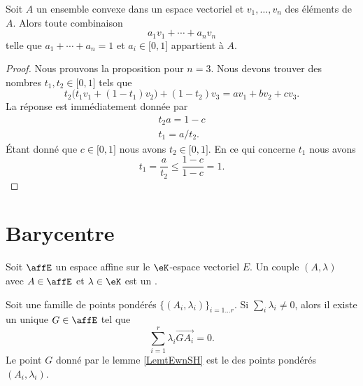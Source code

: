 \begin{proposition}     \label{PropPoNpPz}
    Soit \( A\) un ensemble convexe dans un espace vectoriel et \( v_1,\ldots, v_n\) des éléments de \( A\). Alors toute combinaison
    \begin{equation}
        a_1v_1+\cdots +a_nv_n
    \end{equation}
    telle que \( a_1+\cdots +a_n=1\) et \( a_i\in\mathopen[ 0 , 1 \mathclose]\) appartient à \( A\).
\end{proposition}

\begin{proof}
    Nous prouvons la proposition pour \( n=3\). Nous devons trouver des nombres \( t_1,t_2\in \mathopen[ 0 , 1 \mathclose]\) tels que
    \begin{equation}
        t_2\big( t_1v_1+(1-t_1)v_2 \big)+(1-t_2)v_3=av_1+bv_2+cv_3.
    \end{equation}
    La réponse est immédiatement donnée par
    \begin{subequations}
        \begin{align}
            t_2a=1-c\\
            t_1=a/t_2.
        \end{align}
    \end{subequations}
    Étant donné que \( c\in \mathopen[ 0 , 1 \mathclose]\) nous avons \( t_2\in\mathopen[ 0 , 1 \mathclose]\). En ce qui concerne \( t_1\) nous avons
    \begin{equation}
        t_1=\frac{ a }{ t_2 }\leq \frac{ 1-c }{ 1-c }=1.
    \end{equation}
\end{proof}

\section{Barycentre}

Soit \( \affE\) un espace affine sur le \( \eK\)-espace vectoriel \( E\). Un couple \( (A,\lambda)\) avec \( A\in \affE\) et \( \lambda\in \eK\) est un .

\begin{lemmaDef}        \label{LemtEwnSH}
    Soit une famille de points pondérés \( \{ (A_i,\lambda_i) \}_{i=1\ldots r}\). Si \( \sum_i\lambda_i\neq 0\), alors il existe un unique \( G\in \affE\) tel que
    \begin{equation}
        \sum_{i=1}^r\lambda_i\overrightarrow{ GA_i }=0.
    \end{equation}
    Le point \( G\) donné par le lemme \ref{LemtEwnSH} est le  des points pondérés \( (A_i,\lambda_i)\).
\end{lemmaDef}


